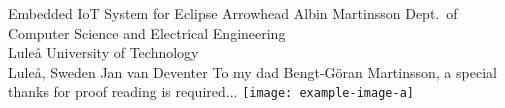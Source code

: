 \documentclass[12pt,a4paper,openright,final,twoside,ieeetran]{main}
\begin{document}
\def\thesistitle{Embedded IoT System for Eclipse Arrowhead}
\def\theauthor{Albin Martinsson}
\def\theaddress{Dept.\ of Computer Science and Electrical Engineering\\
Lule{\aa} University of Technology\\ Lule{\aa}, Sweden}

\def\supervisors{Jan van Deventer}
\def\supervisorstring{Supervisor:} %
\def\dedication{To my dad Bengt-Göran Martinsson, a special thanks for proof reading is required...}

\def\theabstract{}
\def\thepreface{}



\def\thelogo{\texttt{[image: example-image-a]} \\ \vspace{1cm}} %


\startpreamble
  {\thesistitle}
  {\theauthor}
  {\theaddress}
  {\supervisors}
  {\dedication}
  {\theabstract}
  {\thepreface}
  {\thelogo}

\end{document}

